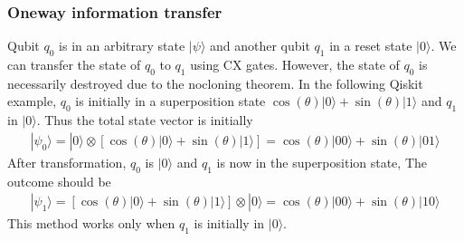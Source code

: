\documentclass[letterpaper,10pt,english]{jupyterBook}
\begin{document}
\subsubsection{One\sphinxhyphen{}way information transfer}
\label{\detokenize{q2gates/cx:one-way-information-transfer}}
\sphinxAtStartPar
Qubit \(q_0\) is in an arbitrary state \(|\psi\rangle\) and another qubit \(q_1\) in a reset state \(|0\rangle\).  We can transfer the state of \(q_0\) to \(q_1\) using CX gates.  However, the state of \(q_0\) is necessarily destroyed due to the no\sphinxhyphen{}cloning theorem.  In the following Qiskit example, \(q_0\) is initially in a superposition state \(\cos(\theta) | 0\rangle + \sin(\theta)|1\rangle\) and \(q_1\) in \(|0\rangle\).  Thus the total state vector is initially
\begin{equation*}
\begin{split}
|\psi_0\rangle = |0\rangle \otimes \left[\cos(\theta)|0\rangle + \sin(\theta)|1\rangle \right] = \cos(\theta) |00\rangle + \sin(\theta) |01\rangle
\end{split}
\end{equation*}
\sphinxAtStartPar
After transformation, \(q_0\) is \(|0\rangle\) and \(q_1\) is now in the superposition state,  The outcome should be
\begin{equation*}
\begin{split}
|\psi_1\rangle = \left[\cos(\theta)|0\rangle + \sin(\theta)|1\rangle \right] \otimes |0\rangle = \cos(\theta) |00\rangle + \sin(\theta) |10\rangle
\end{split}
\end{equation*}
\sphinxAtStartPar
This method works only when \(q_1\) is initially in \(|0\rangle\).
\end{document}
